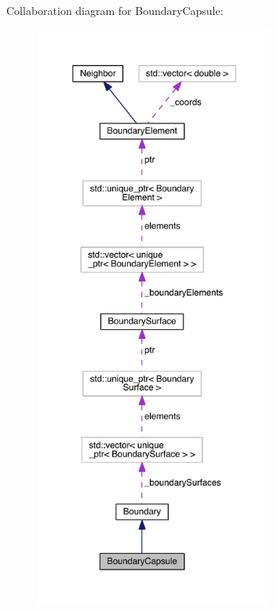 Collaboration diagram for Boundary\+Capsule\+:\nopagebreak
\begin{figure}[H]
\begin{center}
\leavevmode
\includegraphics[height=550pt]{classBoundaryCapsule__coll__graph}
\end{center}
\end{figure}
